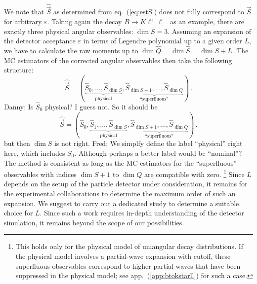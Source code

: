 \documentclass[aps,nofootinbib,preprintnumbers,prd,twocolumn]{revtex4-1}
\newcommand{\est}[1]{\widehat{#1}}
\newcommand{\refapp}[1]{app.~(\ref{app:#1})}
\newcommand{\refeq}[1]{eq.~(\ref{eq:#1})}
\let\eps\varepsilon
\newcommand{\vecest}[1]{\widehat{\vec{#1}}}
\newcommand{\danny}[1]{{\color{purple}#1}}
\newcommand{\fred}[1]{{\color{brown!85!black}#1}}
\newcommand{\add}[1]{\textcolor{green!85!black}{#1}}
\begin{document}
We note that $\vecest{S}$ as determined from \refeq{estS} does not fully correspond to $\vec{S}$
for arbitrary $\eps$. Taking again the decay $B\to K\ell^+\ell^-$
as an example, \add{there are exactly three physical angular observables:} $\dim S = 3$.
Assuming an expansion of the detector acceptance $\eps$
in terms of Legendre polynomial up to a given order $L$, we have to calculate the raw moments up
to $\dim \est{Q} = \dim \est{S} = \dim S + L$. The MC estimators of the corrected angular observables
then take the following structure:
\begin{equation}
    \vecest{S} = ( \underbrace{\est{S}_0, \dots, \est{S}_{\dim S}}_\text{physical}, \underbrace{\est{S}_{\dim S + 1}, \dots, \est{S}_{\dim Q}}_\text{``superfluous''})\,.
\end{equation}
\fred{Danny: Is $\est{S}_0$ physical? I guess not. So it should be
\begin{equation}
    \vecest{S} = ( \est{S}_0, \underbrace{\est{S}_1, \dots, \est{S}_{\dim S}}_\text{physical}, \underbrace{\est{S}_{\dim S + 1}, \dots, \est{S}_{\dim Q}}_\text{``superfluous''})\,.
\end{equation}
but then $\dim S$ is not right.
}
\danny{Fred: We simplfy define the label ``physical'' right here, which includes
$S_0$. Although perhaps a better label would be ``nominal''?}
The method is consistent as long as the MC estimators for the ``superfluous'' observables with indices $\dim S + 1$ to $\dim Q$
are compatible with zero. \footnote{This holds only for the physical model of uniangular decay distributions. If the physical
    model involves a partial-wave expansion with cutoff, these superfluous observables
correspond to higher partial waves that have been suppressed in the physical model; see \refapp{btokstarll} for such a case.}
Since $L$ depends on the setup of the particle detector under consideration, it remains for
the experimental collaborations to determine the maximum order of such an expansion.
\add{We suggest to carry out a dedicated study to determine a suitable choice for $L$.
Since such a work requires in-depth understanding of the detector simulation, it remains
beyond the scope of our possibilities.}\\
\end{document}
